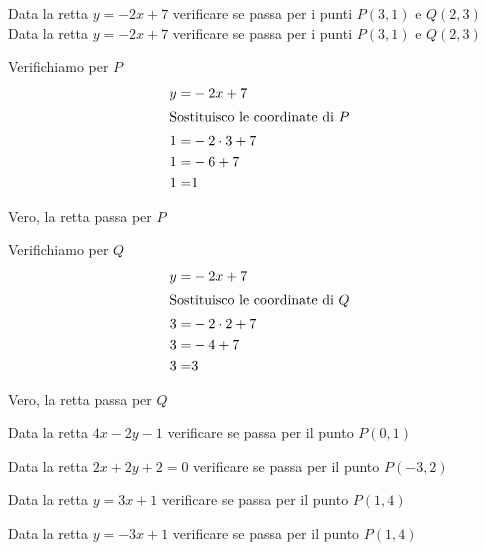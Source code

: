 \begin{exercise}
	Data la retta $y=-2x+7$ verificare se passa per i punti $P(3,1)$ e $Q(2,3)$
	\tcblower
	Data la retta $y=-2x+7$ verificare se passa per i punti $P(3,1)$ e $Q(2,3)$
	
	Verifichiamo per $P$
	\begin{align*}
	y=&-2x+7\\
		\intertext{Sostituisco le coordinate di $P$}
		1=&-2\cdot 3 +7\\
		1=&-6 +7\\
		1=&1
	\end{align*}
	
	Vero, la retta  passa per $P$
	
	Verifichiamo per $Q$
\begin{align*}
	y=&-2x+7\\
	\intertext{Sostituisco le coordinate di $Q$}
	3=&-2\cdot 2 +7\\
	3=&-4 +7\\
	3=&3
\end{align*}
	
	Vero, la retta passa per $Q$
\end{exercise}
\begin{exercise}[no solution]
	Data la retta $4x-2y-1$ verificare se passa per il punto $P(0,1)$
\end{exercise}
\begin{exercise}[no solution]
	Data la retta $2x+2y+2=0$ verificare se passa per il punto $P(-3,2)$
\end{exercise}
\begin{exercise}[no solution]
	Data la retta $y=3x+1$ verificare se passa per il punto $P(1,4)$
\end{exercise}
\begin{exercise}[no solution]
	Data la retta $y=-3x+1$ verificare se passa per il punto $P(1,4)$
\end{exercise}
